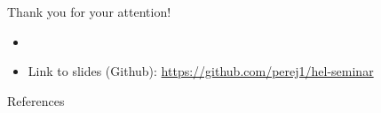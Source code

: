 \documentclass[11pt, aspectratio=169]{beamer}
\begin{document}

\begin{frame}
  Thank you for your attention!
  \begin{itemize}
    \item[]
    \item Link to slides (Github):
    \textcolor{hyscience}{\url{https://github.com/perej1/hel-seminar}}
  \end{itemize}
\end{frame}


\begin{frame}[allowframebreaks]{References}
  \printbibliography
\end{frame}
\end{document}

